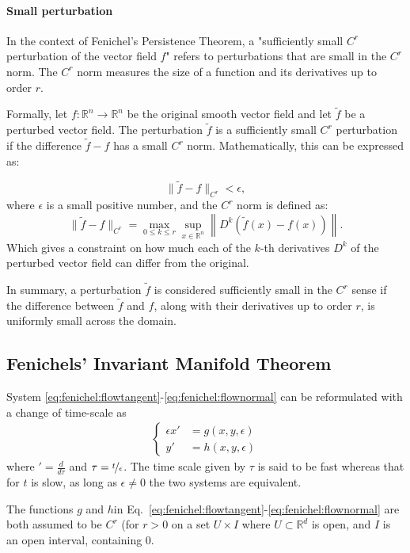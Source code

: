 \documentclass{article} %
\newcounter{ct}
\newcommand{\reals}{\mathbb{R}}
\theoremstyle{definition}
\theoremstyle{remark}
\begin{document}
\paragraph{Small perturbation}
In the context of Fenichel's Persistence Theorem, a "sufficiently small \( C^r \) perturbation of the vector field \( f \)" refers to perturbations that are small in the \( C^r \) norm. The \( C^r \) norm measures the size of a function and its derivatives up to order \( r \).

Formally, let \( f: \mathbb{R}^n \rightarrow \mathbb{R}^n \) be the original smooth vector field and let \( \tilde{f} \) be a perturbed vector field. The perturbation \( \tilde{f} \) is a sufficiently small \( C^r \) perturbation if the difference \( \tilde{f} - f \) has a small \( C^r \) norm. Mathematically, this can be expressed as:

\[ \| \tilde{f} - f \|_{C^r} < \epsilon, \]
where \( \epsilon \) is a small positive number, and the \( C^r \) norm is defined as:
\[ \| \tilde{f} - f \|_{C^r} = \max_{0 \leq k \leq r} \sup_{x \in \mathbb{R}^n} \left\| D^k (\tilde{f}(x) - f(x)) \right\|. \]
Which gives a constraint on how much each of the \(k\)-th derivatives \( D^k \) of the perturbed vector field can differ from the original.

In summary, a perturbation \( \tilde{f} \) is considered sufficiently small in the \( C^r \) sense if the difference between \( \tilde{f} \) and \( f \), along with their derivatives up to order \( r \), is uniformly small across the domain.


\subsection{Fenichels' Invariant Manifold Theorem}

System \ref{eq:fenichel:flowtangent}-\ref{eq:fenichel:flownormal} can be reformulated with a change of time-scale as
\begin{align}\label{eq:slow}
\begin{cases}
\epsilon x' &= g ( x , y , \epsilon) \\
y'&= h(x, y, \epsilon)
\end{cases}
\end{align}
where  \('=\frac{d}{d\tau}\) and \(\tau=\nicefrac{t}{\epsilon}\).
 The time scale given by \(\tau\) is said to be fast whereas that for \(t\) is slow, as long as \(\epsilon\neq 0\) the two systems are equivalent.


The functions \(g\) and \(h\)in Eq.~\ref{eq:fenichel:flowtangent}-\ref{eq:fenichel:flownormal} are both assumed to be \(C^r\) (for \(r>0\) on a set \(U\times I\) where \(U\subset\reals^d\) is open, and \(I\) is an open interval, containing \(0\).
\end{document}
